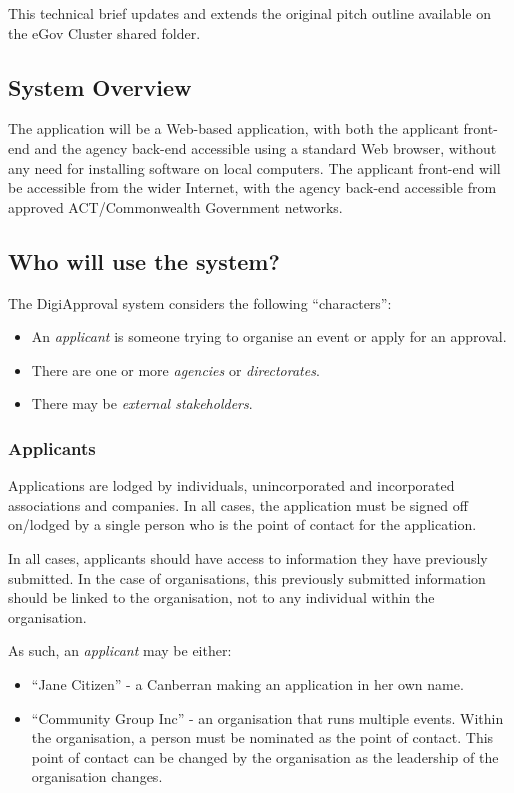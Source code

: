 \documentclass[12pt,a4paper,twosided]{article}
\begin{document}
This technical brief updates and extends the original pitch outline
available on the eGov Cluster shared folder.

\subsection{System Overview}

The application will be a Web-based application, with both the applicant
front-end and the agency back-end accessible using a standard Web
browser, without any need for installing software on local computers.
The applicant front-end will be accessible from the wider Internet, with
the agency back-end accessible from approved ACT/Commonwealth Government
networks.

\subsection{Who will use the system?}

The DigiApproval system considers the following ``characters'':

\begin{itemize}
\itemsep1pt\parskip0pt
\item
  An \emph{applicant} is someone trying to organise an event or apply
  for an approval.
\item
  There are one or more \emph{agencies} or \emph{directorates}.
\item
  There may be \emph{external stakeholders}.
\end{itemize}

\subsubsection{Applicants}

Applications are lodged by individuals, unincorporated and incorporated
associations and companies. In all cases, the application must be signed
off on/lodged by a single person who is the point of contact for the
application.

In all cases, applicants should have access to information they have
previously submitted. In the case of organisations, this previously
submitted information should be linked to the organisation, not to any
individual within the organisation.

As such, an \emph{applicant} may be either:

\begin{itemize}
\itemsep1pt\parskip0pt
\item
  ``Jane Citizen'' - a Canberran making an application in her own name.
\item
  ``Community Group Inc'' - an organisation that runs multiple events.
  Within the organisation, a person must be nominated as the point of
  contact. This point of contact can be changed by the organisation as
  the leadership of the organisation changes.
\end{itemize}
\end{document}
